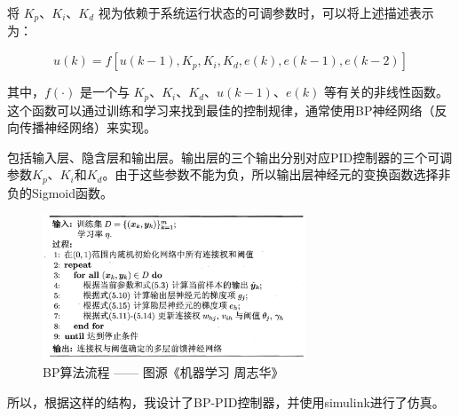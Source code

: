 \documentclass[12pt,a4paper,UTF8]{article}
\begin{document}
将 $K_p$、$K_i$、$K_d$ 视为依赖于系统运行状态的可调参数时，可以将上述描述表示为：

\begin{equation}
u(k) = f[u(k-1), K_p, K_i, K_d, e(k), e(k-1), e(k-2)]
\end{equation}

其中，$f(\cdot)$ 是一个与 $K_p$、$K_i$、$K_d$、$u(k-1)$、$e(k)$ 等有关的非线性函数。这个函数可以通过训练和学习来找到最佳的控制规律，通常使用BP神经网络（反向传播神经网络）来实现。

包括输入层、隐含层和输出层。输出层的三个输出分别对应PID控制器的三个可调参数$K_p$、$K_i$和$K_d$。由于这些参数不能为负，所以输出层神经元的变换函数选择非负的Sigmoid函数。

\begin{figure}[htbp] \centering \includegraphics[width=0.7\textwidth]{2024-12-30-13-30-41.png} \caption{BP算法流程 —— 图源《机器学习 周志华》}\end{figure}

所以，根据这样的结构，我设计了BP-PID控制器，并使用simulink进行了仿真。
\end{document}
